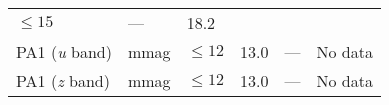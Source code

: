 \begin{longtable}[]{@{}llllll@{}}
\begin{minipage}[t]{0.17\columnwidth}
\(\leq 15\)\strut
\end{minipage} & \begin{minipage}[t]{0.17\columnwidth}\raggedright\strut
---\strut
\end{minipage} & \begin{minipage}[t]{0.12\columnwidth}\raggedright\strut
18.2\strut
\end{minipage} & \begin{minipage}[t]{0.17\columnwidth}\raggedright\strut
\strut
\end{minipage}\tabularnewline
\begin{minipage}[t]{0.14\columnwidth}\raggedright\strut
PA1 (\emph{u} band)\strut
\end{minipage} & \begin{minipage}[t]{0.06\columnwidth}\raggedright\strut
mmag\strut
\end{minipage} & \begin{minipage}[t]{0.17\columnwidth}\raggedright\strut
\(\leq 12\)\strut
\end{minipage} & \begin{minipage}[t]{0.17\columnwidth}\raggedright\strut
13.0\strut
\end{minipage} & \begin{minipage}[t]{0.12\columnwidth}\raggedright\strut
---\strut
\end{minipage} & \begin{minipage}[t]{0.17\columnwidth}\raggedright\strut
No data\strut
\end{minipage}\tabularnewline
\begin{minipage}[t]{0.14\columnwidth}\raggedright\strut
PA1 (\emph{z} band)\strut
\end{minipage} & \begin{minipage}[t]{0.06\columnwidth}\raggedright\strut
mmag\strut
\end{minipage} & \begin{minipage}[t]{0.17\columnwidth}\raggedright\strut
\(\leq 12\)\strut
\end{minipage} & \begin{minipage}[t]{0.17\columnwidth}\raggedright\strut
13.0\strut
\end{minipage} & \begin{minipage}[t]{0.12\columnwidth}\raggedright\strut
---\strut
\end{minipage} & \begin{minipage}[t]{0.17\columnwidth}\raggedright\strut
No data\strut
\end{minipage}\tabularnewline

\end{longtable}
